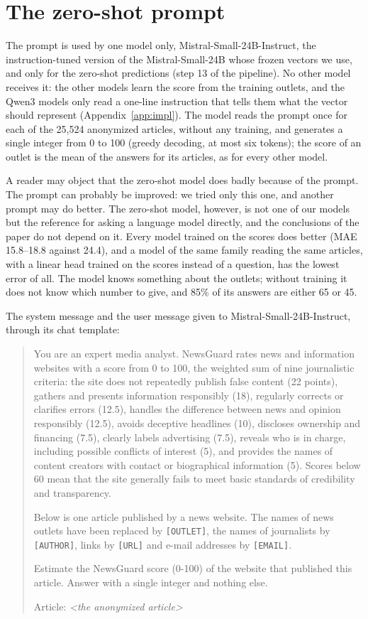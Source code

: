 \documentclass[11pt,a4paper]{article}
\begin{document}
\section{The zero-shot prompt}\label{app:prompt}
The prompt is used by one model only, Mistral-Small-24B-Instruct, the instruction-tuned version of the Mistral-Small-24B
whose frozen vectors we use, and only for the zero-shot predictions (step 13 of the pipeline). No other model receives
it: the other models learn the score from the training outlets, and the Qwen3 models only read a one-line instruction
that tells them what the vector should represent (Appendix~\ref{app:impl}). The model reads the prompt once for each of
the 25,524 anonymized articles, without any training, and generates a single integer from 0 to 100 (greedy decoding, at
most six tokens); the score of an outlet is the mean of the answers for its articles, as for every other model.

A reader may object that the zero-shot model does badly because of the prompt. The prompt can probably be
improved: we tried only this one, and another prompt may do better. The zero-shot model, however, is not one of our
models but the reference for asking a language model directly, and the conclusions of the paper do not depend on it.
Every model trained on the scores does better (MAE 15.8--18.8 against 24.4), and a model of the same family reading the
same articles, with a linear head trained on the scores instead of a question, has the lowest error of all. The model
knows something about the outlets; without training it does not know which number to give, and 85\% of its answers are
either 65 or 45.

The system message and the user message given to Mistral-Small-24B-Instruct, through its chat template:

\begin{quote}\small
You are an expert media analyst. NewsGuard rates news and information websites with a score from 0 to 100, the weighted
sum of nine journalistic criteria: the site does not repeatedly publish false content (22 points), gathers and presents
information responsibly (18), regularly corrects or clarifies errors (12.5), handles the difference between news and
opinion responsibly (12.5), avoids deceptive headlines (10), discloses ownership and financing (7.5), clearly labels
advertising (7.5), reveals who is in charge, including possible conflicts of interest (5), and provides the names of
content creators with contact or biographical information (5). Scores below 60 mean that the site generally fails to
meet basic standards of credibility and transparency.

\smallskip\noindent Below is one article published by a news website. The names of news outlets have been replaced by \texttt{[OUTLET]}, the names of journalists by \texttt{[AUTHOR]}, links by \texttt{[URL]} and e-mail addresses by \texttt{[EMAIL]}.

\smallskip\noindent Estimate the NewsGuard score (0-100) of the website that published this article. Answer with a single integer and nothing else.

\smallskip\noindent Article:
\emph{<the anonymized article>}
\end{quote}
\end{document}

